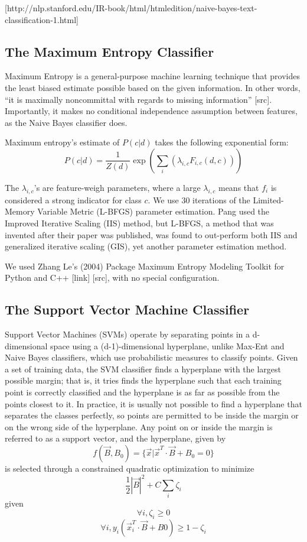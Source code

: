 \documentclass[10pt,twocolumn,letterpaper]{article}
\begin{document}
[http://nlp.stanford.edu/IR-book/html/htmledition/naive-bayes-text-classification-1.html]

\subsection{The Maximum Entropy Classifier}

Maximum Entropy is a general-purpose machine learning technique that provides the least biased estimate possible based on the given information. In other words, “it is maximally noncommittal with regards to missing information” [src]. Importantly, it makes no conditional independence assumption between features, as the Naive Bayes classifier does.

Maximum entropy’s estimate of $P(c|d)$ takes the following exponential form:
$$P(c|d) = \frac{1}{Z(d)} \exp(\sum_i(\lambda_{i,c} F_{i,c}(d,c)))$$

The $\lambda_{i,c}$’s are feature-weigh parameters, where a large $\lambda_{i,c}$ means that $f_i$ is considered a strong indicator for class $c$. We use 30 iterations of the Limited-Memory Variable Metric (L-BFGS) parameter estimation. Pang used the Improved Iterative Scaling (IIS) method, but L-BFGS, a method that was invented after their paper was published, was found to out-perform both IIS and generalized iterative scaling (GIS), yet another parameter estimation method. 

We used Zhang Le’s (2004) Package Maximum Entropy Modeling Toolkit for Python and C++ [link] [src], with no special configuration.

\subsection{The Support Vector Machine Classifier}

Support Vector Machines (SVMs) operate by separating points in a d-dimensional space using a (d-1)-dimensional hyperplane, unlike Max-Ent and Naive Bayes classifiers, which use probabilistic measures to classify points. Given a set of training data, the SVM classifier finds a hyperplane with the largest possible margin; that is, it tries finds the hyperplane such that each training point is correctly classified and the hyperplane is as far as possible from the points closest to it. In practice, it is usually not possible to find a hyperplane that separates the classes perfectly, so points are permitted to be inside the margin or on the wrong side of the hyperplane. Any point on or inside the margin is referred to as a support vector, and the hyperplane, given by
$$f(\vec{B}, B_0) = \{\vec{x} | \vec{x}^T \cdot \vec{B} + B_0 = 0\}$$
is selected through a constrained quadratic optimization to minimize 
$$ \frac{1}{2} |\vec{B}|^2 + C\sum_i \zeta_i$$
given
$$\forall i, \zeta_i \ge 0$$
$$\forall i, y_i  (\vec{x}_i^T \cdot \vec{B} + B0) \ge 1 - \zeta_i $$
\end{document}

